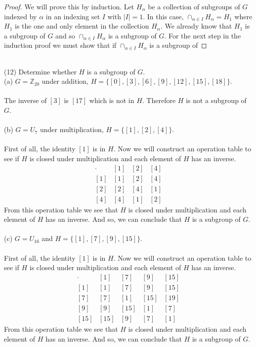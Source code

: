\documentclass[11pt,a4paper]{article}
\begin{document}
\begin{proof}
We will prove this by induction. Let ${H_\alpha}$ be a collection of subgroups of $G$ indexed by $\alpha$ in an indexing set $I$ with $|I|=1$. In this case, $\cap_{\alpha\in I} H_\alpha = H_1$ where $H_1$ is the one and only element in the collection ${H_\alpha}$. We already know that $H_1$ is a subgroup of $G$ and so $\cap_{\alpha\in I} H_\alpha$ is a subgroup of $G$. For the next step in the induction proof we must show that if $\cap_{\alpha\in I} H_\alpha$ is a subgroup of 
\end{proof}
~\\
(12) Determine whether $H$ is a subgroup of $G$.\\
(a) $G=\mathbb{Z}_{20}$ under addition, $H=\{[0],[3],[6],[9],[12],[15],[18]\}$.\\
~\\
The inverse of $[3]$ is $[17]$ which is not in $H$. Therefore $H$ is not a subgroup of $G$.\\
~\\
(b) $G=U_7$ under multiplication, $H=\{[1],[2],[4]\}$.\\
~\\
First of all, the identity $[1]$ is in $H$. Now we will construct an operation table to see if $H$ is closed under multiplication and each element of $H$ has an inverse.
\[
\begin{array}{c|c|c|c}
\cdot & [1] & [2] & [4]\\\hline
[1] & [1] & [2] & [4]\\\hline
[2] & [2] & [4] & [1]\\\hline
[4] & [4] & [1] & [2]
\end{array}
\]
From this operation table we see that $H$ is closed under multiplication and each element of $H$ has an inverse. And so, we can conclude that $H$ is a subgroup of $G$.\\
~\\
(c) $G=U_{16}$ and $H=\{[1],[7],[9],[15]\}$.\\
~\\
First of all, the identity $[1]$ is in $H$. Now we will construct an operation table to see if $H$ is closed under multiplication and each element of $H$ has an inverse.
\[
\begin{array}{c|c|c|c|c}
\cdot & [1] & [7] & [9] & [15] \\\hline
[1] & [1] & [7] & [9] & [15]\\ \hline
[7] & [7] & [1] & [15] & [19] \\ \hline
[9] & [9] & [15] & [1] & [7] \\ \hline
[15] & [15] & [9] & [7] & [1]
\end{array} 
\]
From this operation table we see that $H$ is closed under multiplication and each element of $H$ has an inverse. And so, we can conclude that $H$ is a subgroup of $G$.\\
\end{document}
